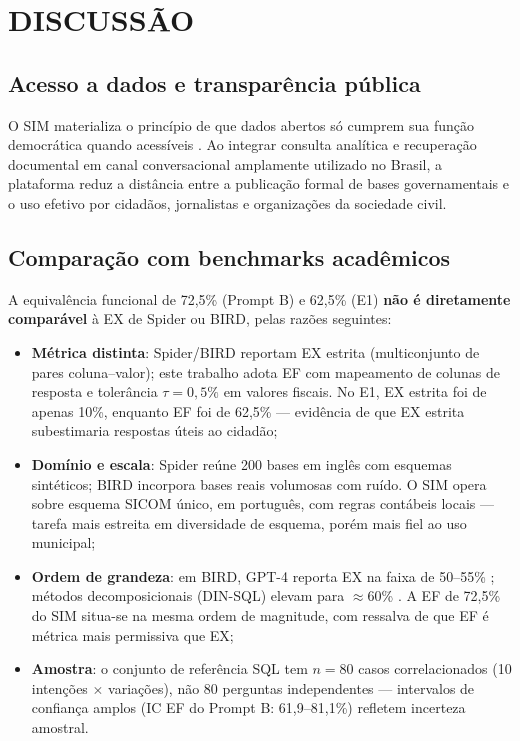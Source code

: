 \chapter{\MakeUppercase{Discussão}}

\section{Acesso a dados e transparência pública}

O SIM materializa o princípio de que dados abertos só cumprem sua função democrática quando acessíveis \cite{Brasil2016DadosAbertos,Lei2012LAI}. Ao integrar consulta analítica e recuperação documental em canal conversacional amplamente utilizado no Brasil, a plataforma reduz a distância entre a publicação formal de bases governamentais e o uso efetivo por cidadãos, jornalistas e organizações da sociedade civil.

\section{Comparação com benchmarks acadêmicos}

A equivalência funcional de 72,5\% (Prompt B) e 62,5\% (E1) \textbf{não é diretamente comparável} à EX de Spider ou BIRD, pelas razões seguintes:

\begin{itemize}
    \item \textbf{Métrica distinta}: Spider/BIRD reportam EX estrita (multiconjunto de pares coluna--valor); este trabalho adota EF com mapeamento de colunas de resposta e tolerância $\tau = 0{,}5\%$ em valores fiscais. No E1, EX estrita foi de apenas 10\%, enquanto EF foi de 62,5\% --- evidência de que EX estrita subestimaria respostas úteis ao cidadão;
    \item \textbf{Domínio e escala}: Spider reúne 200 bases em inglês com esquemas sintéticos; BIRD incorpora bases reais volumosas com ruído. O SIM opera sobre esquema SICOM único, em português, com regras contábeis locais --- tarefa mais estreita em diversidade de esquema, porém mais fiel ao uso municipal;
    \item \textbf{Ordem de grandeza}: em BIRD, GPT-4 reporta EX na faixa de 50--55\% \cite{Li2024BIRD}; métodos decomposicionais (DIN-SQL) elevam para $\approx$60\% \cite{Pourreza2024DIN}. A EF de 72,5\% do SIM situa-se na mesma ordem de magnitude, com ressalva de que EF é métrica mais permissiva que EX;
    \item \textbf{Amostra}: o conjunto de referência SQL tem $n=80$ casos correlacionados (10 intenções $\times$ variações), não 80 perguntas independentes --- intervalos de confiança amplos (IC EF do Prompt B: 61,9--81,1\%) refletem incerteza amostral.
\end{itemize}


